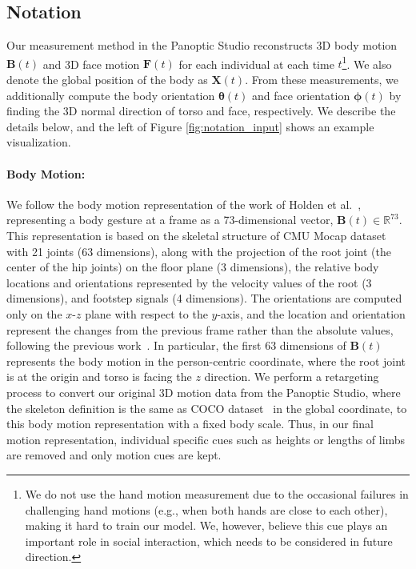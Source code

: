 \subsection{Notation}
\label{section:Notation}
Our measurement method in the Panoptic Studio reconstructs 3D body motion $\mathbf{B}(t)$ and 3D face motion $\mathbf{F}(t)$ for each individual at each time $t$\footnote{We do not use the hand motion measurement due to the occasional failures in challenging hand motions (e.g., when both hands are close to each other), making it hard to train our model. We, however, believe this cue plays an important role in social interaction, which needs to be considered in future direction.}. We also denote the global position of the body as $\mathbf{X}(t)$. From these measurements, we additionally compute the body orientation $\boldsymbol{\theta}(t)$ and face orientation $\boldsymbol{\phi}(t)$ by finding the 3D normal direction of torso and face, respectively. We describe the details below, and the left of Figure \ref{fig:notation_input} shows an example visualization.

\paragraph{Body Motion:} We follow the body motion representation of the work of Holden et al.~\cite{holden2016deep}, representing a body gesture at a frame as a 73-dimensional vector, $\mathbf{B}(t) \in \mathbb{R}^{73}$. This representation is based on the skeletal structure of CMU Mocap dataset~\cite{gross2001cmu} with 21 joints (63 dimensions), along with the projection of the root joint (the center of the hip joints) on the floor plane (3 dimensions), the relative body locations and orientations represented by the velocity values of the root (3 dimensions), and footstep signals (4 dimensions). The orientations are computed only on the $x$-$z$ plane with respect to the $y$-axis, and the location and orientation represent the changes from the previous frame rather than the absolute values, following the previous work~\cite{jain2016structural, holden2016deep}. In particular, the first 63 dimensions of $\mathbf{B}(t)$ represents the body motion in the person-centric coordinate, where the root joint is at the origin and torso is facing the $z$ direction. We perform a retargeting process to convert our original 3D motion data from the Panoptic Studio, where the skeleton definition is the same as COCO dataset~\cite{coco-14} in the global coordinate, to this body motion representation with a fixed body scale. Thus, in our final motion representation, individual specific cues such as heights or lengths of limbs are removed and only motion cues are kept.


